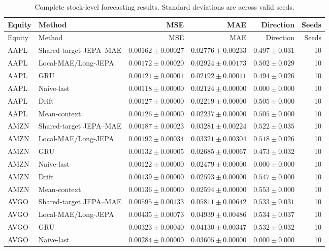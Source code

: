 \begin{longtable}{llrrrr}
\caption{Complete stock-level forecasting results. Standard deviations are across valid seeds.}\label{tab:appendix_stock_metrics}\\
\toprule
Equity & Method & MSE & MAE & Direction & Seeds \\
\midrule
\endfirsthead
\toprule
Equity & Method & MSE & MAE & Direction & Seeds \\
\midrule
\endhead
AAPL & Shared-target JEPA--MAE & $0.00162 \pm 0.00027$ & $0.02776 \pm 0.00233$ & $0.497 \pm 0.031$ & 10 \\
AAPL & Local-MAE/Long-JEPA & $0.00172 \pm 0.00020$ & $0.02924 \pm 0.00173$ & $0.502 \pm 0.029$ & 10 \\
AAPL & GRU & $0.00121 \pm 0.00001$ & $0.02192 \pm 0.00011$ & $0.494 \pm 0.026$ & 10 \\
AAPL & Naive-last & $0.00118 \pm 0.00000$ & $0.02124 \pm 0.00000$ & $0.000 \pm 0.000$ & 10 \\
AAPL & Drift & $0.00127 \pm 0.00000$ & $0.02219 \pm 0.00000$ & $0.505 \pm 0.000$ & 10 \\
AAPL & Mean-context & $0.00126 \pm 0.00000$ & $0.02237 \pm 0.00000$ & $0.505 \pm 0.000$ & 10 \\
AMZN & Shared-target JEPA--MAE & $0.00187 \pm 0.00023$ & $0.03281 \pm 0.00224$ & $0.522 \pm 0.035$ & 10 \\
AMZN & Local-MAE/Long-JEPA & $0.00192 \pm 0.00034$ & $0.03321 \pm 0.00304$ & $0.518 \pm 0.026$ & 10 \\
AMZN & GRU & $0.00132 \pm 0.00005$ & $0.02685 \pm 0.00067$ & $0.473 \pm 0.032$ & 10 \\
AMZN & Naive-last & $0.00122 \pm 0.00000$ & $0.02479 \pm 0.00000$ & $0.000 \pm 0.000$ & 10 \\
AMZN & Drift & $0.00139 \pm 0.00000$ & $0.02593 \pm 0.00000$ & $0.547 \pm 0.000$ & 10 \\
AMZN & Mean-context & $0.00136 \pm 0.00000$ & $0.02594 \pm 0.00000$ & $0.553 \pm 0.000$ & 10 \\
AVGO & Shared-target JEPA--MAE & $0.00595 \pm 0.00133$ & $0.05811 \pm 0.00642$ & $0.533 \pm 0.031$ & 10 \\
AVGO & Local-MAE/Long-JEPA & $0.00435 \pm 0.00073$ & $0.04939 \pm 0.00486$ & $0.534 \pm 0.037$ & 10 \\
AVGO & GRU & $0.00323 \pm 0.00040$ & $0.04130 \pm 0.00347$ & $0.532 \pm 0.032$ & 10 \\
AVGO & Naive-last & $0.00284 \pm 0.00000$ & $0.03605 \pm 0.00000$ & $0.000 \pm 0.000$ & 10 \\

\end{longtable}
